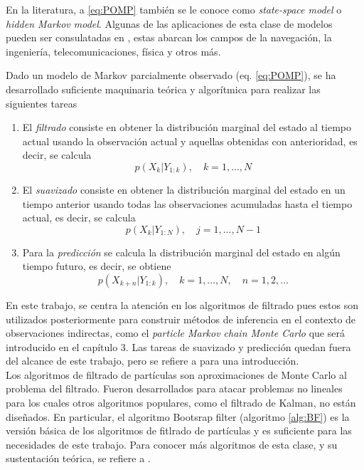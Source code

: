 En la literatura, a \ref{eq:POMP} también se le conoce como \textit{state-space model} 
o \textit{hidden Markov model}. Algunas de las aplicaciones de esta clase de modelos 
pueden ser consulatadas en \cite{sarkkaBayesianFilteringSmoothing2023}, estas 
abarcan los campos de la navegación, la ingeniería, telecomunicaciones, física y 
otros más.

Dado un modelo de Markov parcialmente observado (eq. \ref{eq:POMP}), se ha desarrollado
suficiente maquinaria teórica y algorítmica para realizar las siguientes tareas 
\begin{enumerate}
    \item El \textit{filtrado} consiste en obtener la distribución marginal del 
    estado al tiempo actual usando la observación actual y aquellas 
    obtenidas con anterioridad, es decir, se calcula 
    $$p(X_k|Y_{1:k}),\quad k = 1,...,N$$
    \item El \textit{suavizado} consiste en obtener la distribución marginal 
    del estado en un tiempo anterior usando todas las observaciones acumuladas hasta 
    el tiempo actual, es decir, se calcula 
    $$p(X_k|Y_{1:N}),\quad j = 1,...,N-1$$
    \item Para la \textit{predicción} se calcula la distribución marginal del estado 
    en algún tiempo futuro, es decir, se obtiene 
    $$p(X_{k+n}|Y_{1:k}),\quad k = 1,...,N,\quad n=1,2,...$$
\end{enumerate}

En este trabajo, se centra la atención en los algoritmos de filtrado 
pues estos son utilizados posteriormente para construir métodos de inferencia 
en el contexto de observaciones indirectas, 
como el \textit{particle Markov chain Monte Carlo} que será introducido 
en el capítulo 3. Las tareas de suavizado y predicción quedan fuera del 
alcance de este trabajo, pero se refiere a \cite{sarkkaBayesianFilteringSmoothing2023}
para una introducción.\\

Los algoritmos de filtrado de partículas son aproximaciones de Monte Carlo al problema 
del filtrado. Fueron desarrollados para atacar problemas no lineales para los cuales 
otros algoritmos populares, como el filtrado de Kalman, no están diseñados. En particular, 
el algoritmo Bootsrap filter (algoritmo \ref{alg:BF}) es la versión básica de los algoritmos 
de fitlrado de partículas y es suficiente para las necesidades de este trabajo. 
Para conocer más algoritmos de esta clase, y su sustentación teórica, se refiere a 
\cite{sarkkaBayesianFilteringSmoothing2023}.

